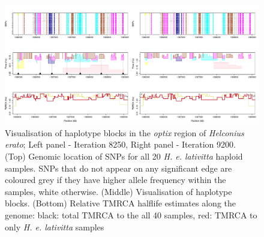 \documentclass[
]{article}
\begin{document}
\begin{figure}

{\centering \includegraphics{figS9-1} 

}

\caption{ \footnotesize Visualisation of haplotype blocks in the \textit{optix} region of \textit{Helconius erato}; Left panel - Iteration 8250, Right panel - Iteration 9200. (Top) Genomic location of SNPs for all 20 \textit{H. e. lativitta} haploid samples. SNPs that do not appear on any significant edge are coloured grey if they have higher allele frequency within the samples, white otherwise. (Middle) Visualisation of haplotype blocks. (Bottom) Relative TMRCA halflife estimates along the genome: black: total TMRCA to the all 40 samples, red: TMRCA to only \textit{H. e. lativitta} samples}\label{fig:figS9}
\end{figure}
\end{document}
